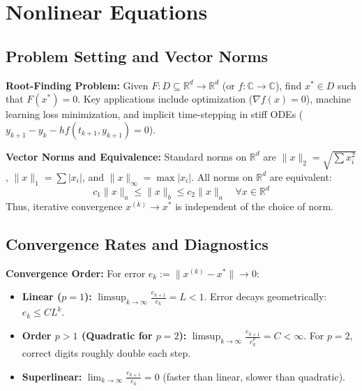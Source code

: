\section{Nonlinear Equations}

\subsection{Problem Setting and Vector Norms}

\begin{definition}
    \textbf{Root-Finding Problem:} Given $F: D \subseteq \mathbb{R}^d \to \mathbb{R}^d$ (or $f: \mathbb{C} \to \mathbb{C}$), find $x^* \in D$ such that $F(x^*) = 0$.
    Key applications include optimization ($\nabla f(x) = 0$), machine learning loss minimization, and implicit time-stepping in stiff ODEs ($y_{k+1} - y_k - h f(t_{k+1}, y_{k+1}) = 0$).
\end{definition}

\begin{theorem}
    \textbf{Vector Norms and Equivalence:} Standard norms on $\mathbb{R}^d$ are $\|x\|_2 = \sqrt{\sum x_i^2}$, $\|x\|_1 = \sum |x_i|$, and $\|x\|_\infty = \max |x_i|$. All norms on $\mathbb{R}^d$ are equivalent:
    $$
        c_1 \|x\|_a \le \|x\|_b \le c_2 \|x\|_a \quad \forall x \in \mathbb{R}^d
    $$
    Thus, iterative convergence $x^{(k)} \to x^*$ is independent of the choice of norm.
\end{theorem}

\subsection{Convergence Rates and Diagnostics}

\begin{definition}
    \textbf{Convergence Order:} For error $e_k := \|x^{(k)} - x^*\| \to 0$:
    \begin{itemize}
        \item \textbf{Linear ($p = 1$):} $\limsup_{k \to \infty} \frac{e_{k+1}}{e_k} = L < 1$. Error decays geometrically: $e_k \le C L^k$.
        \item \textbf{Order $p > 1$ (Quadratic for $p=2$):} $\limsup_{k \to \infty} \frac{e_{k+1}}{e_k^p} = C < \infty$. For $p = 2$, correct digits roughly double each step.
        \item \textbf{Superlinear:} $\lim_{k \to \infty} \frac{e_{k+1}}{e_k} = 0$ (faster than linear, slower than quadratic).
    \end{itemize}
\end{definition}

